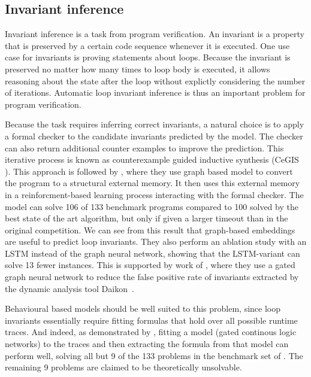 \documentclass[sigconf,authordraft=true,nonacm=true]{acmart}
\begin{document}
\subsection{Invariant inference}
Invariant inference is a task from program verification.
An invariant is a property that is preserved by a certain code sequence whenever it is executed.
One use case for invariants is proving statements about loops.
Because the invariant is preserved no matter how many times to loop body is executed, it allows reasoning about the state after the loop without explictly considering the number of iterations.
Automatic loop invariant inference is thus an important problem for program verification.

Because the task requires inferring correct invariants, a natural choice is to apply a formal checker to the candidate invariants predicted by the model.
The checker can also return additional counter examples to improve the prediction.
This iterative process is known as counterexample guided inductive synthesis (CeGIS \cite{solar-lezama_combinatorial_2006}).
This approach is followed by \citet{si_learning_2018}, where they use graph based model to convert the program to a structural external memory.
It then uses this external memory in a reinforcment-based learning process interacting with the formal checker.
The model can solve 106 of 133 benchmark programs compared to 100 solved by the best state of the art algorithm, but only if given a larger timeout than in the original competition.
We can see from this result that graph-based embeddings are useful to predict loop invariants.
They also perform an ablation study with an LSTM instead of the graph neural network, showing that the LSTM-variant can solve 13 fewer instances.
This is supported by work of \citet{hellendoorn_are_2019}, where they use a gated graph neural network to reduce the false positive rate of invariants extracted by the dynamic analysis tool Daikon~\cite{ernst_daikon_2007}.

Behavioural based models should be well suited to this problem, since loop invariants essentially require fitting formulas that hold over all possible runtime traces.
And indeed, as demonstrated by \citet{yao_learning_2020}, fitting a model (gated continous logic networks) to the traces and then extracting the formula from that model can perform well, solving all but 9 of the 133 problems in the benchmark set of \citet{si_learning_2018}.
The remaining 9 problems are claimed to be theoretically unsolvable.
\end{document}
